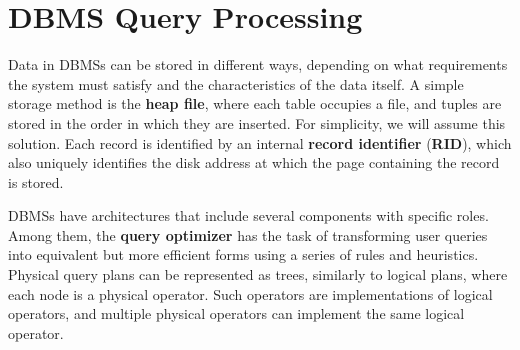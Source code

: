 \section{DBMS Query Processing}

Data in DBMSs can be stored in different ways, depending on what requirements the system must satisfy and the characteristics of the data itself. A simple storage method is the \textbf{heap file}, where each table occupies a file, and tuples are stored in the order in which they are inserted. For simplicity, we will assume this solution. Each record is identified by an internal \textbf{record identifier} (\textbf{RID}), which also uniquely identifies the disk address at which the page containing the record is stored.

DBMSs have architectures that include several components with specific roles. Among them, the \textbf{query optimizer} has the task of transforming user queries into equivalent but more efficient forms using a series of rules and heuristics. Physical query plans can be represented as trees, similarly to logical plans, where each node is a physical operator. Such operators are implementations of logical operators, and multiple physical operators can implement the same logical operator.

